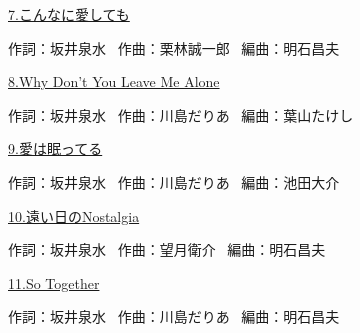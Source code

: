 \small{\hyperlink{3_6}{7.こんなに愛しても}}

\tiny{作詞：坂井泉水 \ 作曲：栗林誠一郎 \ 編曲：明石昌夫}

\small{\hyperlink{3_7}{8.Why Don't You Leave Me Alone}}

\tiny{作詞：坂井泉水 \ 作曲：川島だりあ \ 編曲：葉山たけし}

\small{\hyperlink{3_8}{9.愛は眠ってる}}

\tiny{作詞：坂井泉水 \ 作曲：川島だりあ \ 編曲：池田大介}

\small{\hyperlink{3_9}{10.遠い日のNostalgia}}

\tiny{作詞：坂井泉水 \ 作曲：望月衛介 \ 編曲：明石昌夫}

\small{\hyperlink{3_10}{11.So Together}}

\tiny{作詞：坂井泉水 \ 作曲：川島だりあ \ 編曲：明石昌夫}

\small{ \ }

\tiny{ \ }

\clearpage